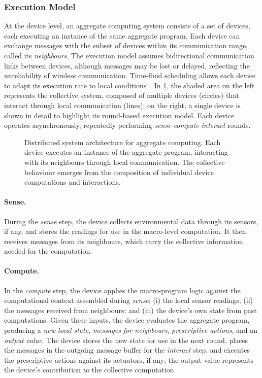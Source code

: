 \subsubsection{Execution Model}
\label{subsubsec:ac-execution-model}

At the device level,
an aggregate computing system consists of a set of devices,
each executing an instance of the same aggregate program.
%
Each device can exchange messages with the subset of devices within its communication range,
called its \emph{neighbours}.
%
The execution model assumes bidirectional communication links between devices,
although messages may be lost or delayed,
reflecting the unreliability of wireless communication.
%
Time-fluid scheduling allows each device to adapt its execution rate to local conditions~\cite{DBLP:journals/lmcs/PianiniCVMZ21}.
%
In \cref{fig:ac-architecture}, the shaded area on the left represents the collective system,
composed of multiple devices (circles) that interact through local communication (lines);
on the right,
a single device is shown in detail to highlight its round-based execution model.
%
Each device operates asynchronously,
repeatedly performing \emph{sense-compute-interact} rounds.

\begin{figure}[t]
    \centering
    
    \caption[Distributed architecture and execution rounds in aggregate computing]{
        Distributed system architecture for aggregate computing.
        Each device executes an instance of the aggregate program, interacting with its neighbours through local communication.
        The collective behaviour emerges from the composition of individual device computations and interactions.}
    \label{fig:ac-architecture}
\end{figure}

\paragraph{Sense.}
During the \emph{sense} step,
the device collects environmental data through its sensors, if any,
and stores the readings for use in the macro-level computation.
%
It then receives messages from its neighbours,
which carry the collective information needed for the computation.
%

\paragraph{Compute.}
In the \emph{compute} step,
the device applies the macro-program logic against the computational context assembled during \emph{sense}:
(i) the local sensor readings;
(ii) the messages received from neighbours;
and (iii) the device's own state from past computations.
%
Given these inputs,
the device evaluates the aggregate program,
producing a \emph{new local state},
\emph{messages for neighbours},
\emph{prescriptive actions},
and an \emph{output value}.
%
The device stores the new state for use in the next round,
places the messages in the outgoing message buffer for the \emph{interact} step,
and executes the prescriptive actions against its actuators, if any;
the output value represents the device's contribution to the collective computation.

